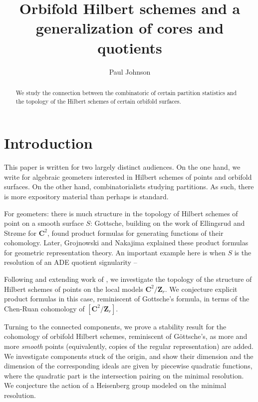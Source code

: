 \documentclass{amsart}[12pt]
\theoremstyle{definition}
\newcommand{\Z}{\mathbf{Z}}
\newcommand{\C}{\mathbf{C}}
\begin{document}
\begin{abstract}
We study the connection between the combinatoric of certain partition statistics and the topology of the Hilbert schemes of certain orbifold surfaces.
\end{abstract}


\title{Orbifold Hilbert schemes and a generalization of cores and quotients}


\author{Paul Johnson}
\address{University of Sheffield}


\maketitle
\setcounter{tocdepth}{2}
\tableofcontents
\section{Introduction}
\cite{GLMpower}

This paper is written for two largely distinct audiences.  On the one hand, we write for algebraic geometers interested in Hilbert schemes of points and orbifold surfaces.  On the other hand, combinatorialists studying partitions.  As such, there is more expository material than perhaps is standard. 

For geometers: there is much structure in the topology of Hilbert schemes of point on a smooth surface $S$: Gottsche, building on the work of Ellingsrud and Str\o me for $\C^2$, found product formulas for generating functions of their cohomology.  Later, Grojnowski and Nakajima \cite{grojnowski, nakajimaheisenberg} explained these product formulas for geometric representation theory.  An important example here is when $S$ is the resolution of an ADE quotient signularity -- 

Following and extending work of , we investigate the topology of the structure of Hilbert schemes of points on the local models $\C^2/\Z_r$.  We conjecture explicit product formulas in this case, reminiscent of Gottsche's formula, in terms of the Chen-Ruan cohomology of $[\C^2/\Z_r]$.  

Turning to the connected components, we prove a stability result for the cohomology of orbifold Hilbert schemes, reminiscent of G\"ottsche's, as more and more \emph{smooth} points (equivalently, copies of the regular representation) are added.  We investigate components stuck of the origin, and show their dimension and the dimension of the corresponding ideals are given by piecewise quadratic functions, where the quadratic part is the intersection pairing on the minimal resolution.  We conjecture the action of a Heisenberg group modeled on the minimal resolution.
\end{document}
